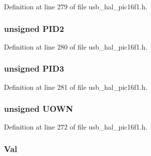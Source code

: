 Definition at line 279 of file usb\+\_\+hal\+\_\+pic16f1.\+h.

\hypertarget{union___b_d___s_t_a_t_aef3d6a9445a3c61d870212360c0a6110}{}
\subsubsection[{P\+I\+D2}]{\setlength{\rightskip}{0pt plus 5cm}unsigned P\+I\+D2}\label{union___b_d___s_t_a_t_aef3d6a9445a3c61d870212360c0a6110}


Definition at line 280 of file usb\+\_\+hal\+\_\+pic16f1.\+h.

\hypertarget{union___b_d___s_t_a_t_a771971768126aebea428ac7194b17fc0}{}
\subsubsection[{P\+I\+D3}]{\setlength{\rightskip}{0pt plus 5cm}unsigned P\+I\+D3}\label{union___b_d___s_t_a_t_a771971768126aebea428ac7194b17fc0}


Definition at line 281 of file usb\+\_\+hal\+\_\+pic16f1.\+h.

\hypertarget{union___b_d___s_t_a_t_abc982c28d59f8e36dbcb06639010169d}{}
\subsubsection[{U\+O\+W\+N}]{\setlength{\rightskip}{0pt plus 5cm}unsigned U\+O\+W\+N}\label{union___b_d___s_t_a_t_abc982c28d59f8e36dbcb06639010169d}


Definition at line 272 of file usb\+\_\+hal\+\_\+pic16f1.\+h.

\hypertarget{union___b_d___s_t_a_t_a5ab8c2bf45b20b5f7aa3a4f083896cec}{}
\subsubsection[{Val}]{ Val}\label{union___b_d___s_t_a_t_a5ab8c2bf45b20b5f7aa3a4f083896cec}


